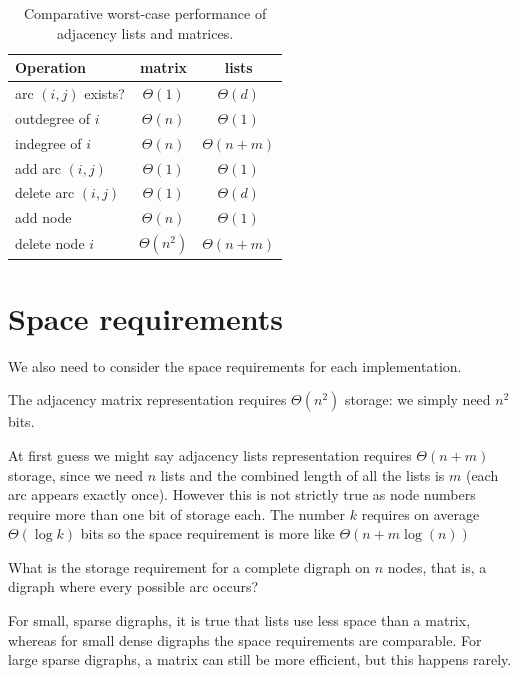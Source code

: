 \begin{table}
\caption{Comparative worst-case performance of adjacency lists and matrices.}
\label{table:list-vs-matrix}

\begin{center}
\begin{tabular}{|l|c|c|}
\hline

\textbf{Operation} & \textbf{matrix} & \textbf{lists} \\
\hline

arc $(i, j)$ exists? & $\Theta(1)$  & $\Theta(d)$ \\
\hline
outdegree  of $i$ & $\Theta(n)$ & $\Theta(1)$ \\
\hline
indegree of $i$ & $\Theta(n)$ &  $\Theta(n+m)$ \\
\hline
add arc $(i, j)$ & $\Theta(1)$ & $\Theta(1)$  \\
\hline
delete arc $(i, j)$ & $\Theta(1)$  & $\Theta(d)$  \\
\hline
add node & $\Theta(n)$ & $\Theta(1)$  \\
\hline
delete node $i$ & $\Theta(n^2)$  & $\Theta(n+m)$  \\
\hline
\end{tabular}
\end{center}
\end{table}


\section{Space requirements}

We also need to consider the space requirements for each implementation. 

The adjacency matrix
representation requires $\Theta(n^2)$ storage: we simply need $n^2$
bits. 

At first guess we might say adjacency lists representation requires
$\Theta(n+m)$ storage, since we need $n$ lists and the combined length of all the lists is $m$ (each arc appears exactly once).
However this is not strictly true as node numbers require more than one bit of storage each. The number $k$ requires on average  $\Theta(\log k)$ bits so the space requirement is more like $\Theta(n+m \log(n))$ 


\beginboxedexample
What is the storage requirement for a complete digraph on $n$ nodes, that is, a digraph where every possible arc
occurs?
\endboxedexample{2cm}

For small, sparse digraphs,
it is true that lists use less space than a matrix, whereas for small
dense digraphs the space requirements are comparable. For large sparse
digraphs, a matrix can still be more efficient, but this happens rarely.

